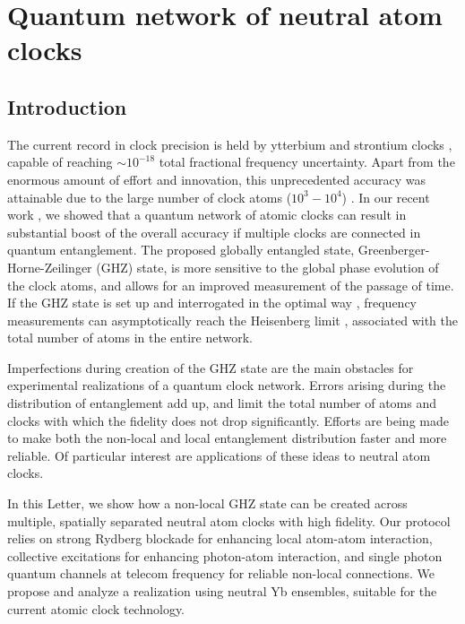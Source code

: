 \chapter{Quantum network of neutral atom clocks}
\label{ch:Komar2015}

\section{Introduction} 
The current record in clock precision is held by ytterbium and strontium clocks
\cite{Ludlow2015}, capable of reaching $\sim 10^{-18}$ total fractional
frequency uncertainty. Apart from the enormous amount of effort and innovation,
this unprecedented accuracy was attainable due to the large number of clock
atoms ($10^3-10^4$) \cite{Hinkley2013, Bloom2013, Nicholson2015}.
In our recent work \cite{Komar2014}, we showed that a quantum network of atomic
clocks can result in substantial boost of the overall accuracy if multiple
clocks are connected in quantum entanglement. The proposed globally entangled
state, Greenberger-Horne-Zeilinger (GHZ) state, is more sensitive to the global
phase evolution of the clock atoms, and allows for an improved measurement of
the passage of time. If the GHZ state is set up and interrogated in the optimal
way \cite{Kessler2014, Berry2009}, frequency measurements can asymptotically
reach the Heisenberg limit \cite{Hall2012}, associated with the total number of
atoms in the entire network.
 
Imperfections during creation of the GHZ state are the main obstacles for
experimental realizations of a quantum clock network. Errors arising during the
distribution of entanglement add up, and limit the total number of atoms and
clocks with which the fidelity does not drop significantly. Efforts are being
made to make both the non-local \cite{sangouard3} and local entanglement
distribution \cite{Sorensen1999, Saffman2010} faster and more reliable. Of
particular interest are applications of these ideas to neutral atom clocks.

In this Letter, we show how a non-local  GHZ state can be created across
multiple, spatially separated neutral atom clocks with high fidelity. Our
protocol relies on strong Rydberg blockade for enhancing local atom-atom
interaction, collective excitations for enhancing photon-atom interaction, and
single photon quantum channels at telecom frequency for reliable non-local
connections. We propose and analyze a realization using neutral Yb ensembles,
suitable for the current atomic clock technology.

